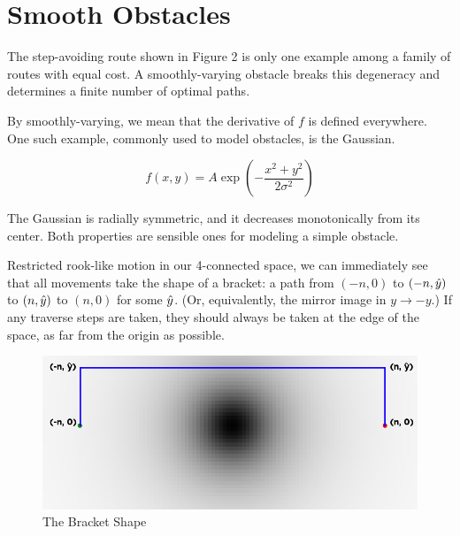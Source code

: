 \section{Smooth Obstacles}
The step-avoiding route shown in Figure 2 is only one example among a family of routes with equal cost. A smoothly-varying obstacle breaks this degeneracy and determines a finite number of optimal paths.

By smoothly-varying, we mean that the derivative of $f$ is defined everywhere. One such example, commonly used to model obstacles, is the Gaussian.

\begin{equation}
f(x, y) = A \exp\left(-\displaystyle\frac{x^2+y^2}{2\sigma^2}\right)
\end{equation}

The Gaussian is radially symmetric, and it decreases monotonically from its center. Both properties are sensible ones for modeling a simple obstacle.

Restricted rook-like motion in our 4-connected space, we can immediately see that all movements take the shape of a bracket: a path from $(-n,0)$ to $(-n, \hat{y})$ to $(n, \hat{y})$ to $(n,0)$ for some $\hat{y}$. (Or, equivalently, the mirror image in $y \rightarrow -y$.) If any traverse steps are taken, they should always be taken at the edge of the space, as far from the origin as possible.

\begin{figure}
\includegraphics[width=\columnwidth]{graphix/bracket.png}
\caption{The Bracket Shape}
\label{fig:bracket}
\end{figure}